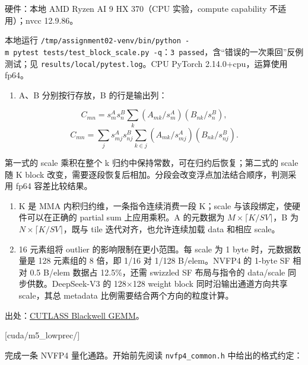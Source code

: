 \documentclass[11pt,a4paper,fontset=fandol]{ctexart}
\providecommand{\tightlist}{\setlength{\itemsep}{0pt}\setlength{\parskip}{0pt}}
\begin{document}
\begin{answer}

硬件：本地 AMD Ryzen AI 9 HX 370（CPU 实验，compute capability
不适用）；nvcc 12.9.86。

本地运行
\texttt{/\allowbreak{}tmp/\allowbreak{}assignment02-\allowbreak{}venv/\allowbreak{}bin/\allowbreak{}python\ -\allowbreak{}m\ pytest\ tests/\allowbreak{}test\_\allowbreak{}block\_\allowbreak{}scale.\allowbreak{}py\ -\allowbreak{}q}：\texttt{3\ passed}，含``错误的一次乘回''反例测试；见
\texttt{results/\allowbreak{}local/\allowbreak{}pytest.\allowbreak{}log}。CPU
PyTorch 2.14.0+cpu，运算使用 fp64。

\begin{enumerate}
\def\labelenumi{(\alph{enumi})}
\tightlist
\item
  A、B 分别按行存放，B 的行是输出列：
\end{enumerate}

\[C_{mn}=s^A_m s^B_n\sum_k(A_{mk}/s^A_m)(B_{nk}/s^B_n),\]
\[C_{mn}=\sum_j s^A_{mj}s^B_{nj}\sum_{k\in j}(A_{mk}/s^A_{mj})(B_{nk}/s^B_{nj}).\]

第一式的 scale 乘积在整个 k 归约中保持常数，可在归约后恢复；第二式的
scale 随 K block
改变，需要逐段恢复后相加。分段会改变浮点加法结合顺序，判测采用 fp64
容差比较结果。

\begin{enumerate}
\def\labelenumi{(\alph{enumi})}
\setcounter{enumi}{1}
\item
  K 是 MMA 内积归约维，一条指令连续消费一段 K；scale
  与该段绑定，使硬件可以在正确的 partial sum 上应用乘积。A 的元数据为
  \(M\times\lceil K/SV\rceil\)，B 为 \(N\times\lceil K/SV\rceil\)，既与
  tile 迭代对齐，也允许连续加载 data 和相应 scale。
\item
  16 元素组将 outlier 的影响限制在更小范围。每 scale 为 1 byte
  时，元数据数量是 128 元素组的 8 倍，即 1/16 对 1/128 B/elem。NVFP4 的
  1-byte SF 相对 0.5 B/elem 数据占 12.5\%，还需 swizzled SF 布局与指令的
  data/scale 同步供数。DeepSeek-V3 的 128×128 weight block
  同时沿输出通道方向共享 scale，其总 metadata
  比例需要结合两个方向的粒度计算。
\end{enumerate}

出处：\href{https://docs.nvidia.com/cutlass/latest/media/docs/cpp/blackwell_functionality.html}{CUTLASS
Blackwell GEMM}。

\end{answer}

[cuda/m5\_lowprec/]

完成一条 NVFP4 量化通路。开始前先阅读
\texttt{nvfp4\_\allowbreak{}common.\allowbreak{}h} 中给出的格式约定：
\end{document}
